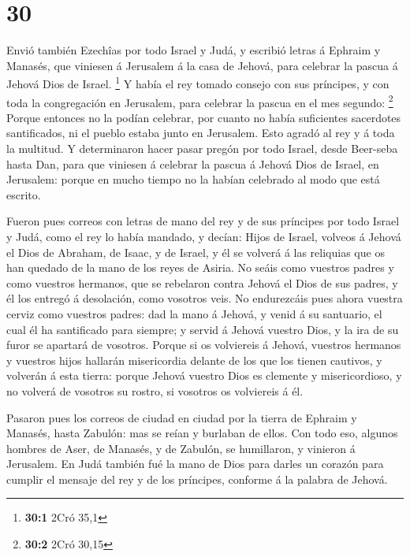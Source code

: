 \hypertarget{section-29}{%
\section{30}\label{section-29}}

 Envió también Ezechîas por todo Israel y Judá, y escribió
letras á Ephraim y Manasés, que viniesen á Jerusalem á la casa de
Jehová, para celebrar la pascua á Jehová Dios de Israel. \footnote{\textbf{30:1}
  2Cró 35,1}  Y había el rey tomado consejo con sus
príncipes, y con toda la congregación en Jerusalem, para celebrar la
pascua en el mes segundo: \footnote{\textbf{30:2} 2Cró 30,15}
 Porque entonces no la podían celebrar, por cuanto no había
suficientes sacerdotes santificados, ni el pueblo estaba junto en
Jerusalem.  Esto agradó al rey y á toda la multitud.
 Y determinaron hacer pasar pregón por todo Israel, desde
Beer-seba hasta Dan, para que viniesen á celebrar la pascua á Jehová
Dios de Israel, en Jerusalem: porque en mucho tiempo no la habían
celebrado al modo que está escrito.

 Fueron pues correos con letras de mano del rey y de sus
príncipes por todo Israel y Judá, como el rey lo había mandado, y
decían: Hijos de Israel, volveos á Jehová el Dios de Abraham, de Isaac,
y de Israel, y él se volverá á las reliquias que os han quedado de la
mano de los reyes de Asiria.  No seáis como vuestros padres
y como vuestros hermanos, que se rebelaron contra Jehová el Dios de sus
padres, y él los entregó á desolación, como vosotros veis. 
No endurezcáis pues ahora vuestra cerviz como vuestros padres: dad la
mano á Jehová, y venid á su santuario, el cual él ha santificado para
siempre; y servid á Jehová vuestro Dios, y la ira de su furor se
apartará de vosotros.  Porque si os volviereis á Jehová,
vuestros hermanos y vuestros hijos hallarán misericordia delante de los
que los tienen cautivos, y volverán á esta tierra: porque Jehová vuestro
Dios es clemente y misericordioso, y no volverá de vosotros su rostro,
si vosotros os volviereis á él.

 Pasaron pues los correos de ciudad en ciudad por la tierra
de Ephraim y Manasés, hasta Zabulón: mas se reían y burlaban de ellos.
 Con todo eso, algunos hombres de Aser, de Manasés, y de
Zabulón, se humillaron, y vinieron á Jerusalem.  En Judá
también fué la mano de Dios para darles un corazón para cumplir el
mensaje del rey y de los príncipes, conforme á la palabra de Jehová.

